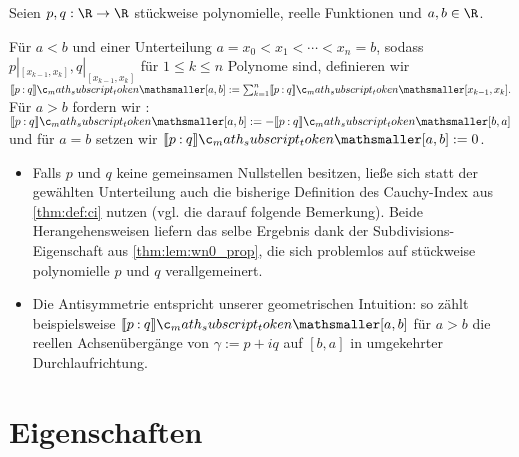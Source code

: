 \documentclass{mythesis}
\begin{document}
\begin{definition} \label{thm:def:ci_pwpoly}
    Seien $p, q: \R \to \R$ stückweise polynomielle, reelle Funktionen und $a, b \in \nobreak \R$.

    Für $a < b$ und einer Unterteilung $a = x_0 < x_1 < \dotsb < x_n = b$, sodass $p|_{[x_{k-1}, x_k]}, q|_{[x_{k-1}, x_k]}$ für $1 \le k \le n$ Polynome sind, definieren wir
    \begin{math}
        \Index{[a,b]}{p}{q}
        := \sum_{k=1}^n \Index{[x_{k-1}, x_k]}{p}{q}.
    \end{math}
    Für $a > b$ fordern wir : $\Index{[a,b]}{p}{q} := -\Index{[b,a]}{p}{q}$ und für $a = b$ setzen wir $\Index{[a,b]}{p}{q} := 0$.
    \begin{note}
        \begin{itemize}
            \item
                Falls $p$ und $q$ keine gemeinsamen Nullstellen besitzen, ließe sich statt der gewählten Unterteilung auch die bisherige Definition des Cauchy-Index aus \ref{thm:def:ci} nutzen (vgl. die darauf folgende Bemerkung).
                Beide Herangehensweisen liefern das selbe Ergebnis dank der Subdivisions-Eigenschaft aus \ref{thm:lem:wn0_prop}, die sich problemlos auf stückweise polynomielle $p$ und $q$ verallgemeinert.
            \item
                Die Antisymmetrie entspricht unserer geometrischen Intuition: so zählt beispielsweise $\Index{[a,b]}{p}{q}$ für $a > b$ die reellen Achsenübergänge von $\gamma := p + iq$ auf $[b, a]$ in umgekehrter Durchlaufrichtung.
        \end{itemize}
    \end{note}
\end{definition}


%
%



\section{Eigenschaften}
\end{document}
